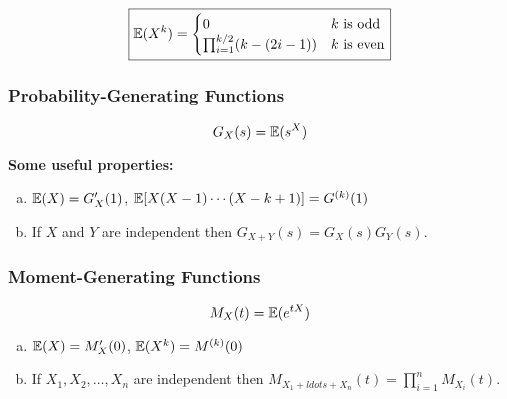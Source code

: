 \[
\boxed{
\E(X^k) = \begin{cases} 0& k \text{ is odd} \\
 \prod_{i=1}^{k/2} (k-(2i-1))  & k \text{ is even} \end{cases}}
\]



\subsubsection{Probability-Generating Functions}

\begin{definition}

\[
G_X(s) = \E(s^X) 
\]

\end{definition}

\begin{theorem} \textbf{Some useful properties:}

\begin{enumerate}[(a)]

\item \(\E(X) = G_X'(1)\), \(\E[X(X-1)\cdots(X - k +1)] = G^{(k)}(1)\)

\item If \(X\) and \(Y\) are independent then \(G_{X +Y}(s) = G_X(s) G_Y(s)\).

\end{enumerate}
\end{theorem}

\subsubsection{Moment-Generating Functions}

\begin{definition}

\[
M_X(t) = \E(e^{tX}) 
\]

\end{definition}

\begin{theorem}\label{prob.mgf.props.thm}

\begin{enumerate}[(a)]

\item \(\E(X) = M_X'(0)\), \(\E(X^k) = M^{(k)}(0)\)

\item If \(X_1, X_2, \ldots, X_n\) are independent then \(M_{X_1 + ldots + X_n}(t) =\prod_{i=1}^n M_{X_i}(t)\).

\end{enumerate}
\end{theorem}


